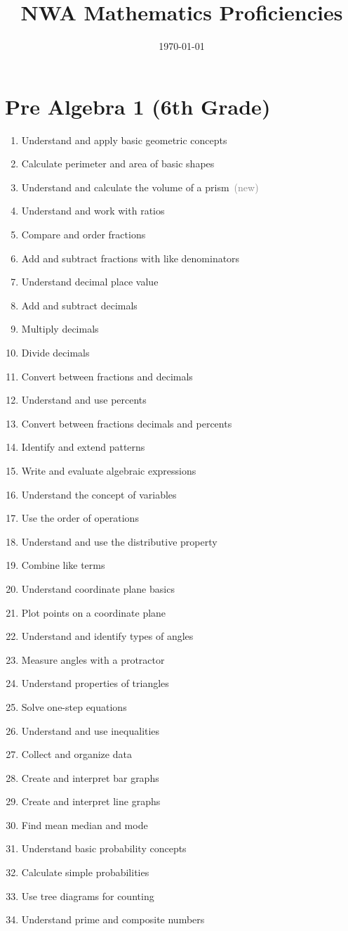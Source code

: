 \documentclass[11pt]{article}
\title{NWA Mathematics Proficiencies}
\date{\today}
\newcommand{\newprof}{\ {\small\textcolor{gray}{(new)}}}
\begin{document}
\maketitle

\section{Pre Algebra 1 (6th Grade)}

\begin{enumerate}
\item Understand and apply basic geometric concepts
\item Calculate perimeter and area of basic shapes
\item Understand and calculate the volume of a prism\newprof
\item Understand and work with ratios
\item Compare and order fractions
\item Add and subtract fractions with like denominators
\item Understand decimal place value
\item Add and subtract decimals
\item Multiply decimals
\item Divide decimals
\item Convert between fractions and decimals
\item Understand and use percents
\item Convert between fractions decimals and percents
\item Identify and extend patterns
\item Write and evaluate algebraic expressions
\item Understand the concept of variables
\item Use the order of operations
\item Understand and use the distributive property
\item Combine like terms
\item Understand coordinate plane basics
\item Plot points on a coordinate plane
\item Understand and identify types of angles
\item Measure angles with a protractor
\item Understand properties of triangles
\item Solve one-step equations
\item Understand and use inequalities
\item Collect and organize data
\item Create and interpret bar graphs
\item Create and interpret line graphs
\item Find mean median and mode
\item Understand basic probability concepts
\item Calculate simple probabilities
\item Use tree diagrams for counting
\item Understand prime and composite numbers
\end{enumerate}
\end{document}
